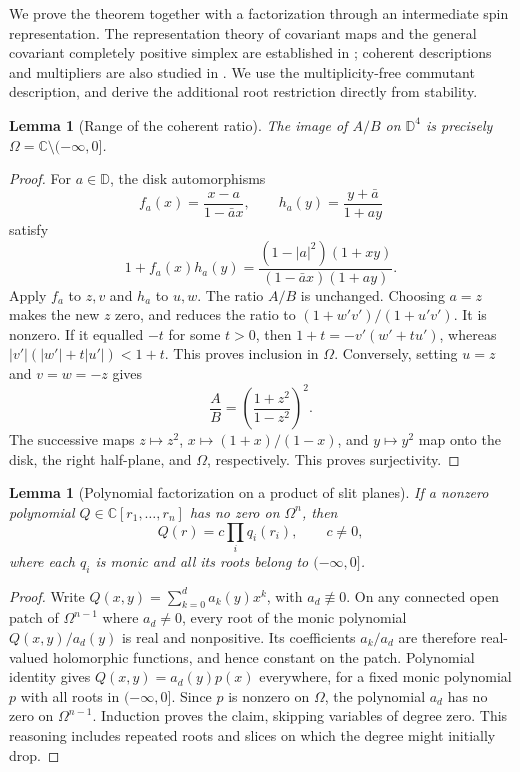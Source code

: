 \documentclass[reqno]{amsart}
\newtheorem{lemma}[theorem]{Lemma}
\theoremstyle{definition}
\theoremstyle{remark}
\newcommand{\C}{\mathbb C}
\newcommand{\D}{\mathbb D}
\begin{document}
We prove the theorem together with a factorization through an intermediate
spin representation.  The representation theory of covariant maps and
the general covariant completely positive simplex are established in
\cite{AlNuwairan14}; coherent descriptions and multipliers are also
studied in \cite{ARS24}.  We use the multiplicity-free commutant
description, and derive the additional root restriction directly from
stability.

\begin{lemma}[Range of the coherent ratio]\label{spin:ratio}
The image of $A/B$ on $\D^4$ is precisely
$\Omega=\C\setminus(-\infty,0]$.
\end{lemma}

\begin{proof}
For $a\in\D$, the disk automorphisms
\[
 f_a(x)=\frac{x-a}{1-\bar a x},\qquad
 h_a(y)=\frac{y+\bar a}{1+ay}
\]
satisfy
\[
 1+f_a(x)h_a(y)=
 \frac{(1-|a|^2)(1+xy)}{(1-\bar a x)(1+ay)}.
\]
Apply $f_a$ to $z,v$ and $h_a$ to $u,w$.  The ratio $A/B$ is unchanged.
Choosing $a=z$ makes the new $z$ zero, and reduces the ratio to
$(1+w'v')/(1+u'v')$.  It is nonzero.  If it equalled $-t$ for some
$t>0$, then $1+t=-v'(w'+tu')$, whereas
$|v'|(|w'|+t|u'|)<1+t$.  This proves inclusion in $\Omega$.
Conversely, setting $u=z$ and $v=w=-z$ gives
\[
 \frac AB=\left(\frac{1+z^2}{1-z^2}\right)^2.
\]
The successive maps $z\mapsto z^2$, $x\mapsto(1+x)/(1-x)$, and
$y\mapsto y^2$ map onto the disk, the right half-plane, and $\Omega$,
respectively.  This proves surjectivity.
\end{proof}

\begin{lemma}[Polynomial factorization on a product of slit planes]
\label{spin:slit-product}
If a nonzero polynomial $Q\in\C[r_1,\ldots,r_n]$ has no zero on
$\Omega^n$, then
\begin{equation}\label{spin:slit-factor}
 Q(r)=c\prod_iq_i(r_i),\qquad c\ne0,
\end{equation}
where each $q_i$ is monic and all its roots belong to $(-\infty,0]$.
\end{lemma}

\begin{proof}
Write $Q(x,y)=\sum_{k=0}^da_k(y)x^k$, with $a_d\not\equiv0$.
On any connected open patch of $\Omega^{n-1}$ where $a_d\ne0$, every
root of the monic polynomial $Q(x,y)/a_d(y)$ is real and nonpositive.
Its coefficients $a_k/a_d$ are therefore real-valued holomorphic
functions, and hence constant on the patch.  Polynomial identity gives
$Q(x,y)=a_d(y)p(x)$ everywhere, for a fixed monic polynomial $p$ with
all roots in $(-\infty,0]$.  Since $p$ is nonzero on $\Omega$, the
polynomial $a_d$ has no zero on $\Omega^{n-1}$.  Induction proves the
claim, skipping variables of degree zero.  This reasoning includes
repeated roots and slices on which the degree might initially drop.
\end{proof}
\end{document}
